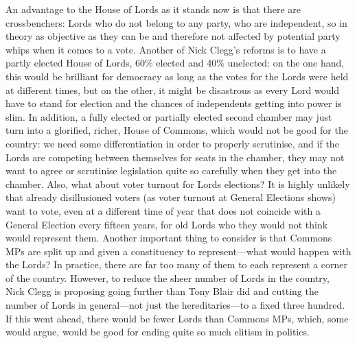 \documentclass[a4paper]{article}
\begin{document}
An advantage to the House of Lords as it stands now is that there are crossbenchers: Lords who do not belong to any party, who are independent, so in theory as objective as they can be and therefore not affected by potential party whips when it comes to a vote.  Another of Nick Clegg's reforms is to have a partly elected House of Lords, 60\% elected and 40\% unelected: on the one hand, this would be brilliant for democracy as long as the votes for the Lords were held at different times, but on the other, it might be disastrous as every Lord would have to stand for election and the chances of independents getting into power is slim.  In addition, a fully elected or partially elected second chamber may just turn into a glorified, richer, House of Commons, which would not be good for the country: we need some differentiation in order to properly scrutinise, and if the Lords are competing between themselves for seats in the chamber, they may not want to agree or scrutinise legislation quite so carefully when they get into the chamber.  Also, what about voter turnout for Lords elections?  It is highly unlikely that already disillusioned voters (as voter turnout at General Elections shows) want to vote, even at a different time of year that does not coincide with a General Election every fifteen years, for old Lords who they would not think would represent them.  Another important thing to consider is that Commons MPs are split up and given a constituency to represent---what would happen with the Lords?  In practice, there are far too many of them to each represent a corner of the country.  However, to reduce the sheer number of Lords in the country, Nick Clegg is proposing going further than Tony Blair did and cutting the number of Lords in general---not just the hereditaries---to a fixed three hundred.  If this went ahead, there would be fewer Lords than Commons MPs, which, some would argue, would be good for ending quite so much elitism in politics.
\end{document}
